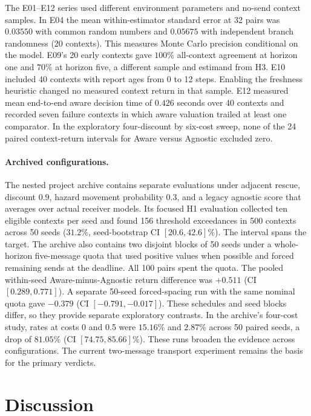 \documentclass{article}
\begin{document}
The E01--E12 series used different environment parameters and no-send context samples. In E04 the mean within-estimator standard error at 32 pairs was $0.03550$ with common random numbers and $0.05675$ with independent branch randomness (20 contexts). This measures Monte Carlo precision conditional on the model. E09's 20 early contexts gave $100\%$ all-context agreement at horizon one and $70\%$ at horizon five, a different sample and estimand from H3. E10 included 40 contexts with report ages from 0 to 12 steps. Enabling the freshness heuristic changed no measured context return in that sample. E12 measured mean end-to-end aware decision time of $0.426$ seconds over 40 contexts and recorded seven failure contexts in which aware valuation trailed at least one comparator. In the exploratory four-discount by six-cost sweep, none of the 24 paired context-return intervals for Aware versus Agnostic excluded zero.

\paragraph{Archived configurations.}
The nested project archive contains separate evaluations under adjacent rescue, discount $0.9$, hazard movement probability $0.3$, and a legacy agnostic score that averages over actual receiver models. Its focused H1 evaluation collected ten eligible contexts per seed and found 156 threshold exceedances in 500 contexts across 50 seeds ($31.2\%$, seed-bootstrap CI $[20.6,42.6]\%$). The interval spans the target. The archive also contains two disjoint blocks of 50 seeds under a whole-horizon five-message quota that used positive values when possible and forced remaining sends at the deadline. All 100 pairs spent the quota. The pooled within-seed Aware-minus-Agnostic return difference was $+0.511$ (CI $[0.289,0.771]$). A separate 50-seed forced-spacing run with the same nominal quota gave $-0.379$ (CI $[-0.791,-0.017]$). These schedules and seed blocks differ, so they provide separate exploratory contrasts. In the archive's four-cost study, rates at costs 0 and 0.5 were $15.16\%$ and $2.87\%$ across 50 paired seeds, a drop of $81.05\%$ (CI $[74.75,85.66]\%$). These runs broaden the evidence across configurations. The current two-message transport experiment remains the basis for the primary verdicts.

\section{Discussion}
\end{document}
